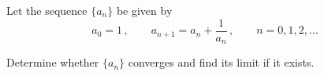 \documentclass[week=3]{homework}
\begin{document}
\begin{questions}
\begin{parts}
	    	\part
	    	
	    \end{parts}
    
	    \question Let the sequence $\{a_n\}$ be given by
	    \[
		    a_0 = 1\,, \qquad a_{n+1} = a_n + \frac{1}{a_n}\,, \qquad n = 0,1,2,\ldots
	    \]
	    
	    Determine whether $\{a_n\}$ converges and find its limit if it exists.
	    
     \end{questions}
\end{document}
